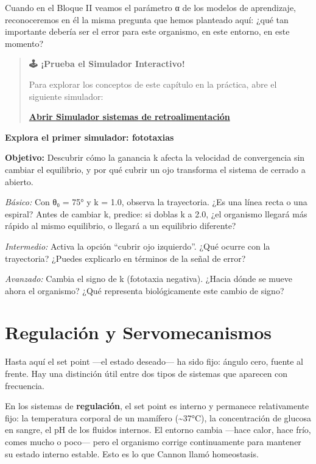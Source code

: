 \documentclass[
  letterpaper,
  DIV=11,
  numbers=noendperiod]{scrreprt}
\begin{document}
\begin{tcolorbox}[enhanced jigsaw, toprule=.15mm, arc=.35mm, colback=white, opacityback=0, colframe=quarto-callout-note-color-frame, breakable, rightrule=.15mm, left=2mm, leftrule=.75mm, bottomrule=.15mm]
Cuando en el Bloque II veamos el parámetro α de los modelos de
aprendizaje, reconoceremos en él la misma pregunta que hemos planteado
aquí: ¿qué tan importante debería ser el error para este organismo, en
este entorno, en este momento?

\begin{quote}
\textbf{🕹️ ¡Prueba el Simulador Interactivo!}

Para explorar los conceptos de este capítulo en la práctica, abre el
siguiente simulador:

\href{https://colab.research.google.com/github/arbouria/Libro-ACA-2026/blob/main/Simuladores/retroalimentacion.ipynb}{\textbf{Abrir
Simulador sistemas de retroalimentación}}
\end{quote}

\textbf{Explora el primer simulador: fototaxias}

\textbf{Objetivo:} Descubrir cómo la ganancia k afecta la velocidad de
convergencia sin cambiar el equilibrio, y por qué cubrir un ojo
transforma el sistema de cerrado a abierto.

\emph{Básico:} Con θ₀ = 75° y k = 1.0, observa la trayectoria. ¿Es una
línea recta o una espiral? Antes de cambiar k, predice: si doblas k a
2.0, ¿el organismo llegará más rápido al mismo equilibrio, o llegará a
un equilibrio diferente?

\emph{Intermedio:} Activa la opción ``cubrir ojo izquierdo''. ¿Qué
ocurre con la trayectoria? ¿Puedes explicarlo en términos de la señal de
error?

\emph{Avanzado:} Cambia el signo de k (fototaxia negativa). ¿Hacia dónde
se mueve ahora el organismo? ¿Qué representa biológicamente este cambio
de signo?

\section{Regulación y
Servomecanismos}\label{regulaciuxf3n-y-servomecanismos}

Hasta aquí el set point ---el estado deseado--- ha sido fijo: ángulo
cero, fuente al frente. Hay una distinción útil entre dos tipos de
sistemas que aparecen con frecuencia.

En los sistemas de \textbf{regulación}, el set point es interno y
permanece relativamente fijo: la temperatura corporal de un mamífero
(\textasciitilde37°C), la concentración de glucosa en sangre, el pH de
los fluidos internos. El entorno cambia ---hace calor, hace frío, comes
mucho o poco--- pero el organismo corrige continuamente para mantener su
estado interno estable. Esto es lo que Cannon llamó homeostasis.


\end{tcolorbox}
\end{document}
